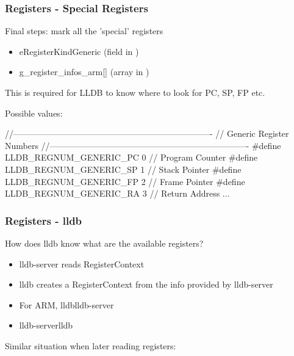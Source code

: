 \begin{frame}[fragile]
\frametitle{Registers - Special Registers}
Final steps: mark all the 'special' registers 
\begin{itemize}
\item {} eRegisterKindGeneric (field in )
\item {} g\_register\_infos\_arm[] (array in )
\end{itemize}
This is required for LLDB to know where to look for PC, SP, FP etc.

\vspace{15pt}
Possible values:
\begin{codebox}
//----------------------------------------------------------------------
// Generic Register Numbers
//----------------------------------------------------------------------
#define LLDB_REGNUM_GENERIC_PC          0   // Program Counter
#define LLDB_REGNUM_GENERIC_SP          1   // Stack Pointer
#define LLDB_REGNUM_GENERIC_FP          2   // Frame Pointer
#define LLDB_REGNUM_GENERIC_RA          3   // Return Address
...
\end{codebox}
\end{frame}

\begin{frame}[fragile]
    \frametitle{Registers - lldb}
How does lldb know what are the available registers?
\begin{itemize}
    \item lldb-server reads RegisterContext
    \item lldb creates a RegisterContext from the info provided by lldb-server
    \item For ARM, lldb\quad \textrightarrow\quad {}\quad \textrightarrow\quad lldb-server
    \item lldb-server\quad \textrightarrow\quad {}\quad \textrightarrow\quad lldb
\end{itemize}
Similar situation when later reading registers:
\end{frame}

